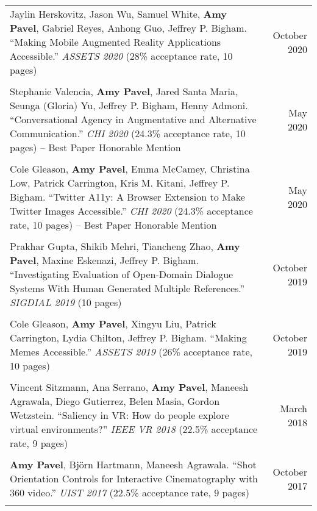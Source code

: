 \begin{longtable}{Xr}
	Jaylin Herskovitz, Jason Wu, Samuel White, \textbf{Amy Pavel}, Gabriel Reyes, Anhong Guo, Jeffrey P. Bigham. ``Making Mobile Augmented Reality Applications Accessible.'' \textit{ASSETS 2020} (28\% acceptance rate, 10 pages) & October 2020 \\
	\\

	Stephanie Valencia, \textbf{Amy Pavel}, Jared Santa Maria, Seunga (Gloria) Yu, Jeffrey P. Bigham, Henny Admoni. ``Conversational Agency in Augmentative and Alternative Communication.'' \textit{CHI 2020} (24.3\% acceptance rate, 10 pages) -- Best Paper Honorable Mention & May 2020 \\
	\\

	Cole Gleason, \textbf{Amy Pavel}, Emma McCamey, Christina Low, Patrick Carrington, Kris M. Kitani, Jeffrey P. Bigham. ``Twitter A11y: A Browser Extension to Make Twitter Images Accessible.'' \textit{CHI 2020} (24.3\% acceptance rate, 10 pages) -- Best Paper Honorable Mention & May 2020 \\
	\\

	Prakhar Gupta, Shikib Mehri, Tiancheng Zhao, \textbf{Amy Pavel}, Maxine Eskenazi, Jeffrey P. Bigham. ``Investigating Evaluation of Open-Domain Dialogue Systems With Human Generated Multiple References.'' \textit{SIGDIAL 2019} (10 pages) & October 2019 \\
	\\

	Cole Gleason, \textbf{Amy Pavel}, Xingyu Liu, Patrick Carrington, Lydia Chilton, Jeffrey P. Bigham. ``Making Memes Accessible.'' \textit{ASSETS 2019} (26\% acceptance rate, 10 pages) & October 2019 \\
	\\

	Vincent Sitzmann, Ana Serrano, \textbf{Amy Pavel}, Maneesh Agrawala, Diego Gutierrez, Belen Masia, Gordon Wetzstein. ``Saliency in VR: How do people explore virtual environments?'' \textit{IEEE VR 2018} (22.5\% acceptance rate, 9 pages) & March 2018 \\
	\\

	\textbf{Amy Pavel}, Björn Hartmann, Maneesh Agrawala. ``Shot Orientation Controls for Interactive Cinematography with 360 video.'' \textit{UIST 2017} (22.5\% acceptance rate, 9 pages) & October 2017 \\
	\\


\end{longtable}
